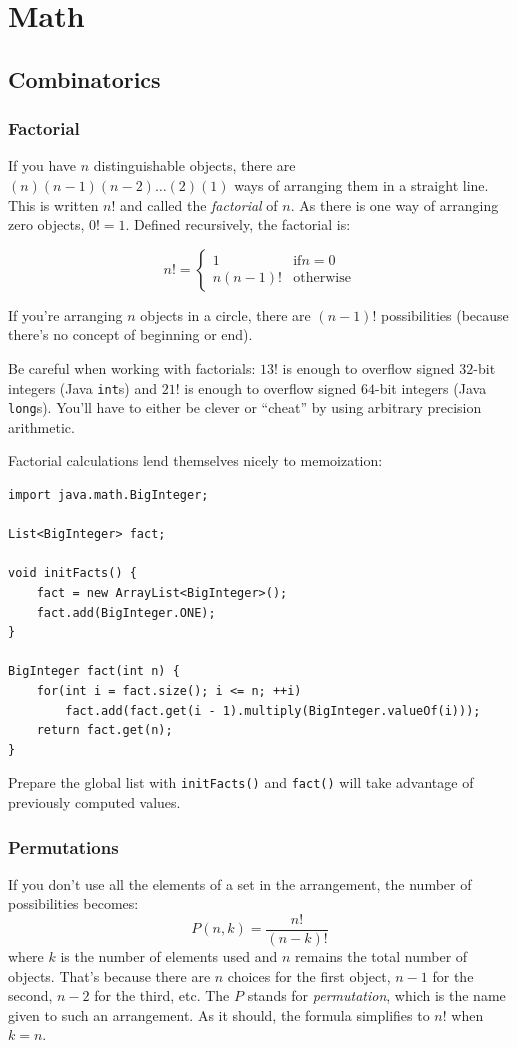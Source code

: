 \documentclass[a4paper,12pt]{article}
\begin{document}
\newpage\section{Math}

\subsection{Combinatorics}

\subsubsection{Factorial}

If you have $n$ distinguishable objects, there are $(n)(n-1)(n-2)\ldots(2)(1)$ ways of arranging them in a straight line. This is written $n!$ and called the {\em factorial} of $n$. As there is one way of arranging zero objects, $0! = 1$. Defined recursively, the factorial is:

\[n! = \begin{cases}1 & \mathrm{if }n=0 \\ n(n-1)! & \mathrm{otherwise}\end{cases}\]

If you're arranging $n$ objects in a circle, there are $(n-1)!$ possibilities (because there's no concept of beginning or end).

Be careful when working with factorials: $13!$ is enough to overflow signed $32$-bit integers (Java \lstinline/int/s) and $21!$ is enough to overflow signed $64$-bit integers (Java \lstinline/long/s). You'll have to either be clever or ``cheat'' by using arbitrary precision arithmetic.

Factorial calculations lend themselves nicely to memoization:

\begin{lstlisting}
import java.math.BigInteger;

List<BigInteger> fact;
	
void initFacts() {
	fact = new ArrayList<BigInteger>();
	fact.add(BigInteger.ONE);
}

BigInteger fact(int n) {
	for(int i = fact.size(); i <= n; ++i)
		fact.add(fact.get(i - 1).multiply(BigInteger.valueOf(i)));
	return fact.get(n);
}
\end{lstlisting}

Prepare the global list with \lstinline/initFacts()/ and \lstinline/fact()/ will take advantage of previously computed values.

\subsubsection{Permutations}
If you don't use all the elements of a set in the arrangement, the number of possibilities becomes:
\[P(n,k) = \frac{n!}{(n-k)!}\]
\noindent where $k$ is the number of elements used and $n$ remains the total number of objects. That's because there are $n$ choices for the first object, $n-1$ for the second, $n-2$ for the third, etc. The $P$ stands for {\em permutation}, which is the name given to such an arrangement. As it should, the formula simplifies to $n!$ when $k=n$.
\end{document}
